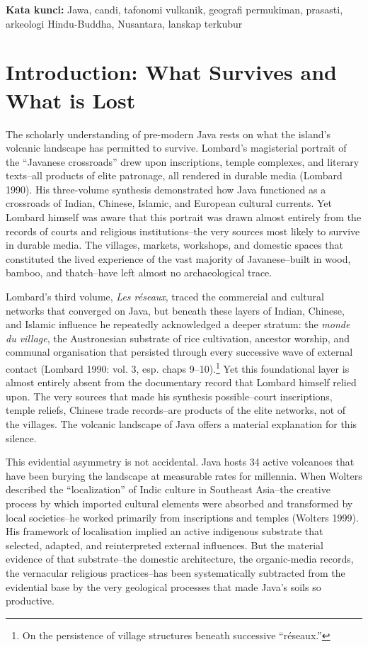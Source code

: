\documentclass[12pt,a4paper]{article}
\begin{document}
\vspace{0.5em}
\noindent\textbf{Kata kunci:} Jawa, candi, tafonomi vulkanik, geografi permukiman, prasasti, arkeologi Hindu-Buddha, Nusantara, lanskap terkubur


\newpage

\section{Introduction: What Survives and What is Lost}

The scholarly understanding of pre-modern Java rests on what the island's volcanic landscape has permitted to survive.
Lombard's magisterial portrait of the ``Javanese crossroads'' drew upon inscriptions, temple complexes, and literary texts--all products of elite patronage, all rendered in durable media (Lombard 1990).
His three-volume synthesis demonstrated how Java functioned as a crossroads of Indian, Chinese, Islamic, and European cultural currents.
Yet Lombard himself was aware that this portrait was drawn almost entirely from the records of courts and religious institutions--the very sources most likely to survive in durable media.
The villages, markets, workshops, and domestic spaces that constituted the lived experience of the vast majority of Javanese--built in wood, bamboo, and thatch--have left almost no archaeological trace.

Lombard's third volume, \emph{Les r\'{e}seaux}, traced the commercial and cultural networks that converged on Java, but beneath these layers of Indian, Chinese, and Islamic influence he repeatedly acknowledged a deeper stratum: the \emph{monde du village}, the Austronesian substrate of rice cultivation, ancestor worship, and communal organisation that persisted through every successive wave of external contact (Lombard 1990: vol. 3, esp. chaps 9--10).\footnote{On the persistence of village structures beneath successive ``r\'{e}seaux.''}
Yet this foundational layer is almost entirely absent from the documentary record that Lombard himself relied upon.
The very sources that made his synthesis possible--court inscriptions, temple reliefs, Chinese trade records--are products of the elite networks, not of the villages.
The volcanic landscape of Java offers a material explanation for this silence.

This evidential asymmetry is not accidental.
Java hosts 34 active volcanoes that have been burying the landscape at measurable rates for millennia.
When Wolters described the ``localization'' of Indic culture in Southeast Asia--the creative process by which imported cultural elements were absorbed and transformed by local societies--he worked primarily from inscriptions and temples (Wolters 1999).
His framework of localisation implied an active indigenous substrate that selected, adapted, and reinterpreted external influences.
But the material evidence of that substrate--the domestic architecture, the organic-media records, the vernacular religious practices--has been systematically subtracted from the evidential base by the very geological processes that made Java's soils so productive.
\end{document}
